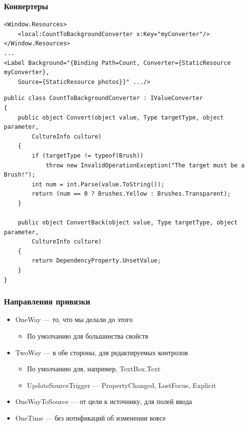 \documentclass[xetex,mathserif,serif]{beamer}
\begin{document}
    \begin{frame}[fragile]
        \frametitle{Конвертеры}
        \begin{ssmall}
            \begin{verbatim}
<Window.Resources>
    <local:CountToBackgroundConverter x:Key="myConverter"/>
</Window.Resources>
...
<Label Background="{Binding Path=Count, Converter={StaticResource myConverter},
    Source={StaticResource photos}}" .../>
            \end{verbatim}
            \vspace{3mm}
            \begin{verbatim}
public class CountToBackgroundConverter : IValueConverter
{
    public object Convert(object value, Type targetType, object parameter,
        CultureInfo culture)
    {
        if (targetType != typeof(Brush))
            throw new InvalidOperationException("The target must be a Brush!");
        int num = int.Parse(value.ToString());
        return (num == 0 ? Brushes.Yellow : Brushes.Transparent);
    }

    public object ConvertBack(object value, Type targetType, object parameter,
        CultureInfo culture)
    {
        return DependencyProperty.UnsetValue;
    }
}
            \end{verbatim}
        \end{ssmall}
    \end{frame}

    \begin{frame}
        \frametitle{Направления привязки}
        \begin{itemize}
            \item OneWay --- то, что мы делали до этого
            \begin{itemize}
                \item По умолчанию для большинства свойств
            \end{itemize}
            \item TwoWay --- в обе стороны, для редактируемых контролов
            \begin{itemize}
                \item По умолчанию для, например, TextBox.Text
                \item UpdateSourceTrigger --- PropertyChanged, LostFocus, Explicit
            \end{itemize}
            \item OneWayToSource --- от цели к источнику, для полей ввода
            \item OneTime --- без нотификаций об изменении вовсе
        \end{itemize}
    \end{frame}
\end{document}
